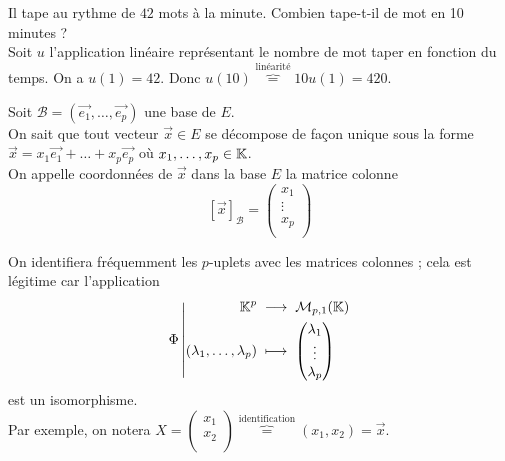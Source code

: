 \documentclass{book}
\begin{document}
\begin{Exemple}
Il tape au rythme de $42$ mots à la minute. Combien tape-t-il de mot en 10 minutes ?\\
Soit $u$ l'application linéaire représentant le nombre de mot taper en fonction du temps. On a $u(1)=42$. Donc 
$u(10)\overbrace{=}^{\text{linéarité}}10u(1)=420$.
\end{Exemple}

\begin{Definition}
Soit $\mathcal{B} = (\vec{e_1},\dots,\vec{e_p})$ une base de $E$.\\
On sait que tout vecteur $\vec{x}\in  E$ se décompose de façon unique sous la forme
$\vec{x} = x_1 \vec{e_1} + \dots + x_p \vec{e_p}$ où $x_1,\dots, x_p \in   \mathbb{K}$.\\
On appelle coordonnées de $\vec{x}$ dans la base $E$ la matrice colonne
\[ [\vec{x}]_\mathcal{B} = \begin{pmatrix}
x_1\\\vdots\\x_p\\
\end{pmatrix} \]
\end{Definition}
\begin{Remarque}
On identifiera fréquemment les $p$-uplets avec les matrices colonnes ;
cela est légitime car l'application
\[ {\Phi }\left|\begin{aligned}{\mathbb{K}^p}&\;\longrightarrow\;{\mathcal{M}_{p,1}(\mathbb{K})}\\{(\lambda_1,\dots,\lambda_p)}&\;\longmapsto\;{\begin{pmatrix}\lambda_1\\\vdots\\\lambda_p\end{pmatrix}}\end{aligned}\right. \]
est un isomorphisme.\\
Par exemple, on notera $X=\begin{pmatrix}x_1\\x_2\\\end{pmatrix}\overbrace{=}^{\text{identification}}(x_1,x_2)=\vec{x}.$
\end{Remarque}
\end{document}
